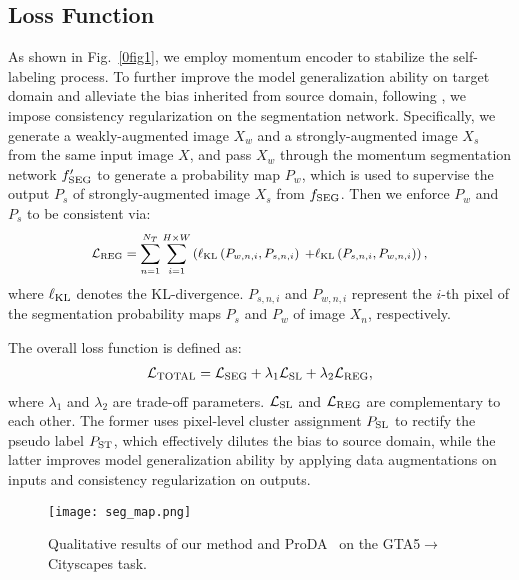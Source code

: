 \documentclass[10pt,twocolumn,letterpaper]{article}
\begin{document}
	\subsection{Loss Function}
	\label{sec3.5}
	As shown in Fig.~\ref{0fig1}, we employ momentum encoder to stabilize the self-labeling process. To further improve the model generalization ability on target domain and alleviate the bias inherited from source domain, following \cite{zhang2021prototypical,araslanov2021self}, we impose consistency regularization on the segmentation network. Specifically, we generate a weakly-augmented image $X_w$ and a strongly-augmented image $X_s$ from the same input image $X$, and pass $X_w$ through the momentum segmentation network $f'_{\rm SEG}$ to generate a probability map $P_w$, which is used to supervise the output $P_s$ of strongly-augmented image $X_s$ from $f_{\rm SEG}$. Then we enforce $P_w$ and $P_s$ to be consistent via:
	\begin{equation}
		{\small 	\begin{split}
				\mathcal{L}_{\rm REG}=\sum_{n=1}^{N_T} \sum_{i=1}^{H \times W}\left(\ell_{\rm KL}\left({P}_{w, n,i}, {P}_{s, n,i}\right)\right. 
				\left.+\ell_{\rm KL}\left({P}_{s, n,i}, {P}_{w, n,i}\right)\right),
			\end{split}
			\label{eq9}}
	\end{equation}
	where $\ell_{\rm KL}$ denotes the KL-divergence. $P_{s,n,i}$ and $P_{w,n,i}$ represent the $i$-th pixel of the segmentation probability maps $P_s$ and $P_w$ of image $X_n$, respectively. 
	
	The overall loss function is defined as:
	\begin{align}
		\mathcal{L}_{\rm TOTAL} = \mathcal{L}_{\rm SEG} + \lambda_1\mathcal{L}_{\rm SL} +\lambda_2\mathcal{L}_{\rm REG},
	\end{align}
	where $\lambda_1$ and $\lambda_2$ are trade-off parameters. $\mathcal{L}_{\rm SL}$ and $\mathcal{L}_{\rm REG}$ are complementary to each other. The former uses pixel-level cluster assignment $P_{\rm SL}$ to rectify the pseudo label $P_{\rm ST}$, which effectively dilutes the bias to source domain, while the latter improves model generalization ability by applying data augmentations on inputs and consistency regularization on outputs. 
	
	\begin{figure*}
		\centering \vspace{-1.5em}
		\texttt{[image: seg\_map.png]}\\
		\vspace{-1.0em}
		\caption{Qualitative results of our method and ProDA~\cite{zhang2021prototypical} on the GTA5$\to$Cityscapes task.}
		\label{fig4}
		\vspace{-1.3em}
	\end{figure*}
	
\end{document}
